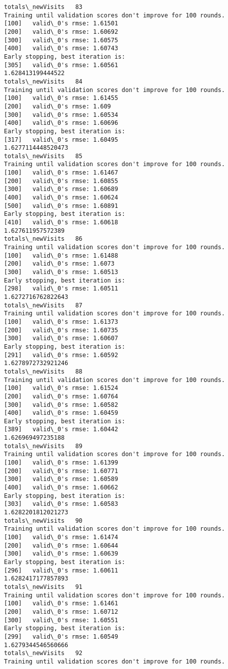 \documentclass[11pt]{article}
\begin{document}
\begin{Verbatim}[commandchars=\\\{\}]
totals\_newVisits   83
Training until validation scores don't improve for 100 rounds.
[100]	valid\_0's rmse: 1.61501
[200]	valid\_0's rmse: 1.60692
[300]	valid\_0's rmse: 1.60575
[400]	valid\_0's rmse: 1.60743
Early stopping, best iteration is:
[305]	valid\_0's rmse: 1.60561
1.628413199444522
totals\_newVisits   84
Training until validation scores don't improve for 100 rounds.
[100]	valid\_0's rmse: 1.61455
[200]	valid\_0's rmse: 1.609
[300]	valid\_0's rmse: 1.60534
[400]	valid\_0's rmse: 1.60696
Early stopping, best iteration is:
[317]	valid\_0's rmse: 1.60495
1.6277114448520473
totals\_newVisits   85
Training until validation scores don't improve for 100 rounds.
[100]	valid\_0's rmse: 1.61467
[200]	valid\_0's rmse: 1.60855
[300]	valid\_0's rmse: 1.60689
[400]	valid\_0's rmse: 1.60624
[500]	valid\_0's rmse: 1.60891
Early stopping, best iteration is:
[410]	valid\_0's rmse: 1.60618
1.627611957572389
totals\_newVisits   86
Training until validation scores don't improve for 100 rounds.
[100]	valid\_0's rmse: 1.61488
[200]	valid\_0's rmse: 1.6073
[300]	valid\_0's rmse: 1.60513
Early stopping, best iteration is:
[298]	valid\_0's rmse: 1.60511
1.6272716762822643
totals\_newVisits   87
Training until validation scores don't improve for 100 rounds.
[100]	valid\_0's rmse: 1.61373
[200]	valid\_0's rmse: 1.60735
[300]	valid\_0's rmse: 1.60607
Early stopping, best iteration is:
[291]	valid\_0's rmse: 1.60592
1.6278972732921246
totals\_newVisits   88
Training until validation scores don't improve for 100 rounds.
[100]	valid\_0's rmse: 1.61524
[200]	valid\_0's rmse: 1.60764
[300]	valid\_0's rmse: 1.60582
[400]	valid\_0's rmse: 1.60459
Early stopping, best iteration is:
[389]	valid\_0's rmse: 1.60442
1.626969497235188
totals\_newVisits   89
Training until validation scores don't improve for 100 rounds.
[100]	valid\_0's rmse: 1.61399
[200]	valid\_0's rmse: 1.60771
[300]	valid\_0's rmse: 1.60589
[400]	valid\_0's rmse: 1.60662
Early stopping, best iteration is:
[303]	valid\_0's rmse: 1.60583
1.6282201812021273
totals\_newVisits   90
Training until validation scores don't improve for 100 rounds.
[100]	valid\_0's rmse: 1.61474
[200]	valid\_0's rmse: 1.60644
[300]	valid\_0's rmse: 1.60639
Early stopping, best iteration is:
[296]	valid\_0's rmse: 1.60611
1.6282417177857893
totals\_newVisits   91
Training until validation scores don't improve for 100 rounds.
[100]	valid\_0's rmse: 1.61461
[200]	valid\_0's rmse: 1.60712
[300]	valid\_0's rmse: 1.60551
Early stopping, best iteration is:
[299]	valid\_0's rmse: 1.60549
1.6279344546560666
totals\_newVisits   92
Training until validation scores don't improve for 100 rounds.

\end{Verbatim}
\end{document}
